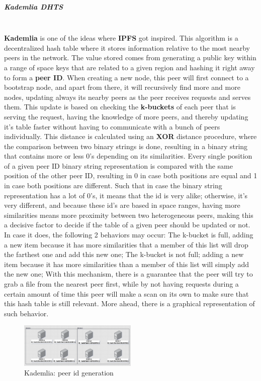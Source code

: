 \subparagraph{Kademlia DHTS}\mbox{}\\
\textbf{Kademlia} \cite{kademlia} is one of the ideas where \textbf{IPFS} got inspired. This algorithm is a decentralized hash table where it stores information relative to the most nearby peers in the network. The value stored comes from generating a public key within a range of space keys that are related to a given region and hashing it right away to form a \textbf{peer ID}. When creating a new node, this peer will first connect to a bootstrap node, and apart from there, it will recursively find more and more nodes, updating always its nearby peers as the peer receives requests and serves them. This update is based on checking the \textbf{k-buckets} of each peer that is serving the request, having the knowledge of more peers, and thereby updating it's table faster without having to communicate with a bunch of peers individually. This distance is calculated using an \textbf{XOR} distance procedure, where the comparison between two binary strings is done, resulting in a binary string that contains more or less 0's depending on its similarities. Every single position of a given peer ID binary string representation is compared with the same position of the other peer ID, resulting in 0 in case both positions are equal and 1 in case both positions are different. Such that in case the binary string representation has a lot of 0's, it means that the id is very alike; otherwise, it's very different, and because these id's are based in space ranges, having more similarities means more proximity between two heterogeneous peers, making this a decisive factor to decide if the table of a given peer should be updated or not. In case it does, the following 2 behaviors may occur: The k-bucket is full, adding a new item because it has more similarities that a member of this list will drop the farthest one and add this new one; The k-bucket is not full; adding a new item because it has more similarities than a member of this list will simply add the new one; With this mechanism, there is a guarantee that the peer will try to grab a file from the nearest peer first, while by not having requests during a certain amount of time this peer will make a scan on its own to make sure that this hash table is still relevant. More ahead, there is a graphical representation of such behavior.

\begin{figure}[H]
    \centering
    \includegraphics[width=0.5\textwidth]{assets/use-case-1/explain-kademlia.png} %
    \caption{Kademlia: peer id generation}
    \label{fig:sample-image} 
\end{figure}

